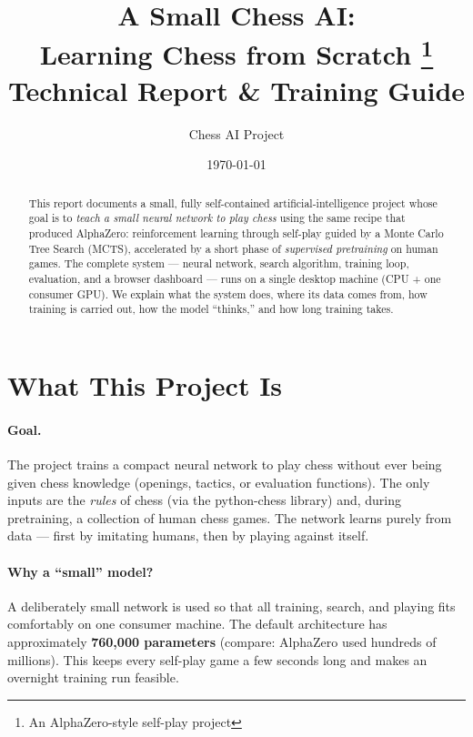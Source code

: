 \documentclass[11pt,a4paper]{article}
\title{\vspace{-1.2cm}\textbf{A Small Chess AI:\\Learning Chess from Scratch}
\thanks{An AlphaZero-style self-play project}
\\[0.4em]\large Technical Report \& Training Guide}
\author{Chess AI Project}
\date{\today}
\begin{document}
\maketitle

\begin{abstract}
\noindent
This report documents a small, fully self-contained artificial-intelligence
project whose goal is to \emph{teach a small neural network to play chess}
using the same recipe that produced AlphaZero: reinforcement learning through
self-play guided by a Monte Carlo Tree Search (MCTS), accelerated by a short
phase of \emph{supervised pretraining} on human games. The complete system ---
neural network, search algorithm, training loop, evaluation, and a browser
dashboard --- runs on a single desktop machine (CPU + one consumer GPU). We
explain what the system does, where its data comes from, how training is
carried out, how the model ``thinks,'' and how long training takes.
\end{abstract}

\tableofcontents

\section{What This Project Is}

\paragraph{Goal.}
The project trains a compact neural network to play chess without ever being
given chess knowledge (openings, tactics, or evaluation functions). The only
inputs are the \emph{rules} of chess (via the python-chess library) and, during
pretraining, a collection of human chess games. The network learns purely from
data --- first by imitating humans, then by playing against itself.

\paragraph{Why a ``small'' model?}
A deliberately small network is used so that all training, search, and playing
fits comfortably on one consumer machine. The default architecture has
approximately \textbf{760,000 parameters} (compare: AlphaZero used hundreds of
millions). This keeps every self-play game a few seconds long and makes an
overnight training run feasible.
\end{document}
